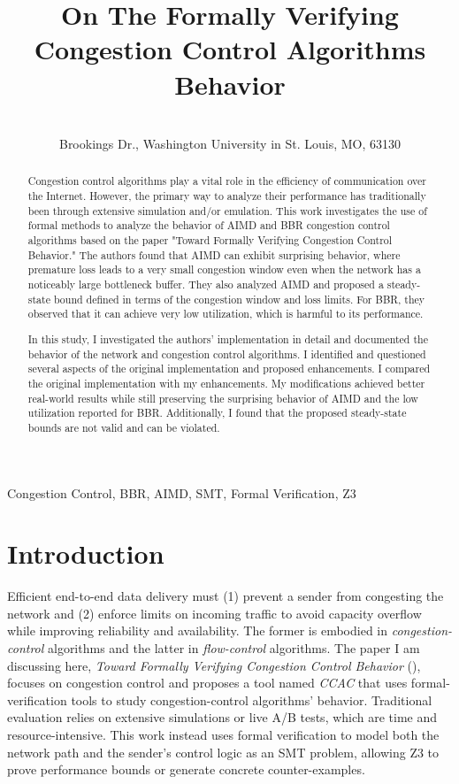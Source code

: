 \documentclass[12pt]{l4dc2023}
\title{On The Formally Verifying Congestion Control Algorithms Behavior}
\author{%
 \Name{Behrooz Farkiani} \Email{b.farkiani@wustl.edu}\\
 \addr 1 Brookings Dr., Washington University in St. Louis, MO, 63130 
}
\begin{document}
\maketitle
\begin{abstract}
Congestion control algorithms play a vital role in the efficiency of communication over the Internet. However, the primary way to analyze their performance has traditionally been through extensive simulation and/or emulation. This work investigates the use of formal methods to analyze the behavior of AIMD and BBR congestion control algorithms based on the paper "Toward Formally Verifying Congestion Control Behavior." The authors found that AIMD can exhibit surprising behavior, where premature loss leads to a very small congestion window even when the network has a noticeably large bottleneck buffer. They also analyzed AIMD and proposed a steady-state bound defined in terms of the congestion window and loss limits. For BBR, they observed that it can achieve very low utilization, which is harmful to its performance.

In this study, I investigated the authors' implementation in detail and documented the behavior of the network and congestion control algorithms. I identified and questioned several aspects of the original implementation and proposed enhancements. I compared the original implementation with my enhancements. My modifications achieved better real-world results while still preserving the surprising behavior of AIMD and the low utilization reported for BBR. Additionally, I found that the proposed steady-state bounds are not valid and can be violated.

\end{abstract}

\begin{keywords}%
  Congestion Control, BBR, AIMD, SMT, Formal Verification, Z3
\end{keywords}

\section{Introduction}

Efficient end-to-end data delivery must (1) prevent a sender from congesting the network and (2) enforce limits on incoming traffic to avoid capacity overflow while improving reliability and availability. The former is embodied in \emph{congestion-control} algorithms and the latter in \emph{flow-control} algorithms. The paper I am discussing here, \emph{Toward Formally Verifying Congestion Control Behavior} (\cite{CCAC}), focuses on congestion control and proposes a tool named \emph{CCAC} that uses formal-verification tools to study congestion-control algorithms' behavior.  
Traditional evaluation relies on extensive simulations or live A/B tests, which are time and resource-intensive. This work instead uses formal verification to model both the network path and the sender's control logic as an SMT problem, allowing Z3 to prove performance bounds or generate concrete counter-examples.
\end{document}
